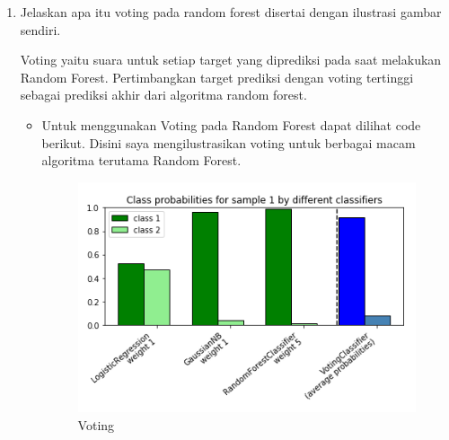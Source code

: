 \begin{enumerate}
\item Jelaskan apa itu voting pada random forest disertai dengan ilustrasi gambar sendiri.\par
Voting yaitu suara untuk setiap target yang diprediksi pada saat melakukan Random Forest. Pertimbangkan target prediksi dengan voting tertinggi sebagai prediksi akhir dari algoritma random forest.
\begin{itemize}
\item
Untuk menggunakan Voting pada Random Forest dapat dilihat code berikut. Disini saya mengilustrasikan voting untuk berbagai macam algoritma terutama Random Forest.
\begin{figure}[ht]
\centering
\includegraphics[scale=0.5]{figures/1174050/chapter3/2.PNG}
\caption{Voting}
\label{contoh}
\end{figure}
\end{itemize}
\end{enumerate}


